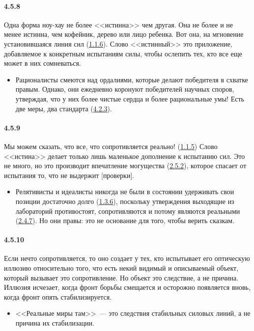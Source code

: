 \paragraph{4.5.8}\hypertarget{par:4.5.8}{} Одна форма ноу-хау не более <<истинна>> чем другая. Она не более и не менее истинна, чем кофейник, дерево или лицо ребенка. Вот она, на мгновение установившаяся линия сил (\hyperlink{par:1.1.6}{1.1.6}). Слово <<истинный>> это приложение, добавляемое к конкретным испытаниям силы, чтобы ослепить тех, кто все еще может в них сомневаться. 
	\begin{itemize}
	\item 
	Рационалисты смеются над ордалиями, которые делают победителя в схватке правым. Однако, они ежедневно коронуют победителей научных споров, утверждая, что у них более чистые сердца и более рациональные умы! Есть две меры, два стандарта (\hyperlink{par:4.2.3}{4.2.3}).
	\end{itemize}	


\paragraph{4.5.9}\hypertarget{par:4.5.9}{} Мы можем сказать, что все, что сопротивляется реально! (\hyperlink{par:1.1.5}{1.1.5}) Слово <<истина>> делает только лишь маленькое дополнение к испытанию сил. Это не много, но это производит впечатление могущества (\hyperlink{par:2.5.2}{2.5.2}), которое спасает от испытания то, что не выдержит [проверки]. 
	\begin{itemize}
	\item 
	Релятивисты и идеалисты никогда не были в состоянии удерживать свои позиции достаточно долго (\hyperlink{par:1.3.6}{1.3.6}), поскольку утверждения выходящие из лабораторий противостоят, сопротивляются и потому являются реальными (\hyperlink{par:2.4.7}{2.4.7}). Но они правы: это не основание для того, чтобы верить сказкам.
	\end{itemize}	

\paragraph{4.5.10}\hypertarget{par:4.5.10}{}Если нечто сопротивляется, то оно создает у тех, кто испытывает его оптическую иллюзию относительно того, что есть некий видимый и описываемый объект, который вызывает это сопротивление. Но объект это следствие, а не причина. Иллюзия исчезает, когда фронт борьбы смещается и осторожно появляется вновь, когда фронт опять стабилизируется. 
	\begin{itemize}
	\item 
	<<Реальные миры там>>~--- это следствия стабильных силовых линий, а не причина их стабилизации.
	\end{itemize}	


